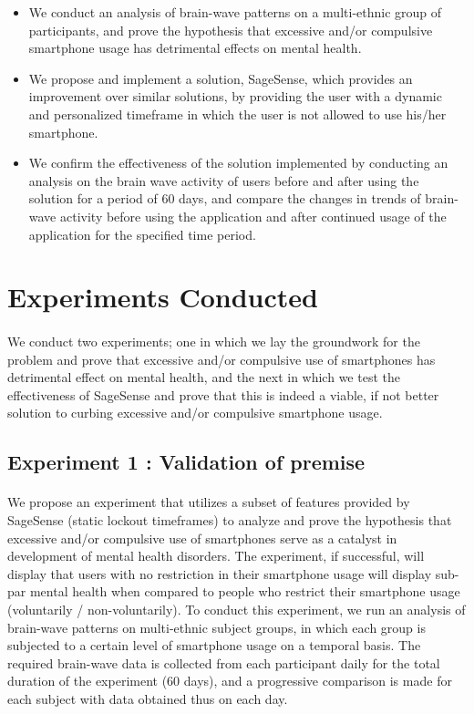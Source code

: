\documentclass{article}
\begin{document}
\begin{itemize}
    \item We conduct an analysis of brain-wave patterns on a multi-ethnic group of participants, and prove the hypothesis that excessive and/or compulsive smartphone usage has detrimental effects on mental health.
    \item We propose and implement a solution, SageSense, which provides an improvement over similar solutions, by providing the user with a dynamic and personalized timeframe in which the user is not allowed to use his/her smartphone.
    \item We confirm the effectiveness of the solution implemented by conducting an analysis on the brain wave activity of users before and after using the solution for a period of 60 days, and compare the changes in trends of brain-wave activity before using the application and after continued usage of the application for the specified time period.
\end{itemize}

\section{Experiments Conducted}

\paragraph{} We conduct two experiments; one in which we lay the groundwork for the problem and prove that excessive and/or compulsive use of smartphones has detrimental effect on mental health, and the next in which we test the effectiveness of SageSense and prove that this is indeed a viable, if not better solution to curbing excessive and/or compulsive smartphone usage.

\subsection{Experiment 1 : Validation of premise}

\paragraph{} We propose an experiment that utilizes a subset of features provided by SageSense (static lockout timeframes) to analyze and prove the hypothesis that excessive and/or compulsive use of smartphones serve as a catalyst in development of mental health disorders. The experiment, if successful, will display that users with no restriction in their smartphone usage will display sub-par mental health when compared to people who restrict their smartphone usage (voluntarily / non-voluntarily). To conduct this experiment, we run an analysis of brain-wave patterns on multi-ethnic subject groups, in which each group is subjected to a certain level of smartphone usage on a temporal basis. The required brain-wave data is collected from each participant daily for the total duration of the experiment (60 days), and a progressive comparison is made for each subject with data obtained thus on each day.
\end{document}
